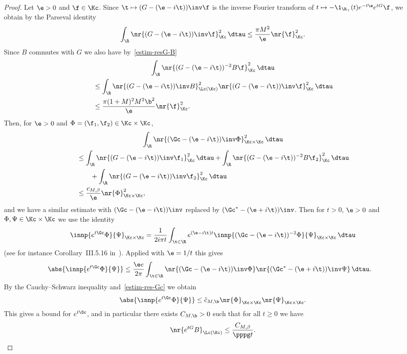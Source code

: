 \begin{proof}
Let $\e > 0$ and $\f \in \Kc$. Since $\t \mapsto (G - (\e-i\t))\inv \f$ is the inverse Fourier transform of $t \mapsto - \1_{\R_+}(t) e^{-t\e} e^{tG} \f$, we obtain by the Parseval identity
\[
\int_\R \nr{(G - (\e-i\t))\inv \f}_\Kc^2 \, \dtau \leq \frac {\pi M^2 }{\e}\nr{\f}_\Kc^2.
\]
Since $B$ commutes with $G$ we also have by~\eqref{estim-resG-B}
\begin{multline*}
\int_\R \nr{(G - (\e-i\t))^{-2} B \f}_\Kc^2 \, \dtau \\
\begin{aligned}
&\leq \int_\R \nr{(G - (\e-i\t))\inv B}_{\Lc(\Kc)}^2 \nr{(G-(\e-i\t))\inv \f}_\Kc^2 \, \dtau \\
&\leq \frac {\pi (1+M)^2M^2 \b^2}{\e}\nr{\f}_\Kc^2.
\end{aligned}
\end{multline*}
Then, for $\e > 0$ and $\Phi = (\f_1,\f_2) \in \Kc \times \Kc$,
\begin{multline}\label{estim-res-Gc}
\int_{\R} \nr{(\Gc-(\e-i\t))\inv \Phi}_{\Kc \times \Kc}^2 \, \dtau\\
\begin{aligned}
& \leq \int_{\R} \nr{(G - (\e-i\t))\inv \f_1}_\Kc^2 \, \dtau + \int_\R \nr{(G-(\e-i\t))^{-2} B \f_2}_\Kc^2 \, \dtau \\
&\qquad + \int_\R \nr{(G - (\e-i\t))\inv \f_2}_\Kc^2 \, \dtau\\
& \leq \frac {c_{M,\beta}} {\e} \nr{\Phi}_{\Kc\times \Kc}^2,
\end{aligned}
\end{multline}
and we have a similar estimate with $(\Gc-(\e-i\t))\inv$ replaced by $(\Gc^*-(\e+i\t))\inv$. Then for $t > 0$, $\e > 0$ and $\Phi, \Psi \in \Kc \times \Kc$ we use the identity
\[
\innp{e^{t\Gc} \Phi}{\Psi}_{\Kc\times \Kc} = \frac 1 {2i\pi t} \int_{\t \in \R} e^{(\e-i\t)t} \innp{(\Gc-(\e-i\t))^{-2} \Phi}{\Psi}_{\Kc\times \Kc} \, \dtau
\]
(see for instance Corollary~III.5.16 in~\cite{engel}). Applied with $\e = 1/t$ this gives
\begin{align*}
\abs{\innp{e^{t\Gc} \Phi}{\Psi}} & \leq \frac {\e e}{2\pi} \int_{\t \in \R} \nr{(\Gc-(\e-i\t))\inv \Phi} \nr{(\Gc^*-(\e+i\t))\inv \Psi} \, \dtau.
\end{align*}
By the Cauchy--Schwarz inequality and~\eqref{estim-res-Gc} we obtain
\[
\abs{\innp{e^{t\Gc} \Phi}{\Psi}} \leq \tilde c_{M,\b} \nr{\Phi}_{\Kc \times \Kc} \nr{\Psi}_{\Kc \times \Kc}.
\]
This gives a bound for $e^{t\Gc}$, and in particular there exists $C_{M,\b} > 0$ such that for all $t \geq 0$ we have
\begin{equation}\label{estim-etG-B}
\nr{e^{tG} B}_{\Lc(\Kc)} \leq \frac {C_{M,\beta}} {\pppg t}.
\end{equation}


\end{proof}
